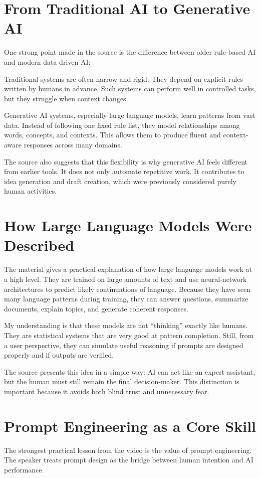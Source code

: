 \documentclass[12pt,a4paper]{article}
\begin{document}
\section*{From Traditional AI to Generative AI}
One strong point made in the source is the difference between older rule-based AI and modern data-driven AI:

Traditional systems are often narrow and rigid. They depend on explicit rules written by humans in advance. Such systems can perform well in controlled tasks, but they struggle when context changes.

Generative AI systems, especially large language models, learn patterns from vast data. Instead of following one fixed rule list, they model relationships among words, concepts, and contexts. This allows them to produce fluent and context-aware responses across many domains.

The source also suggests that this flexibility is why generative AI feels different from earlier tools. It does not only automate repetitive work. It contributes to idea generation and draft creation, which were previously considered purely human activities.

\section*{How Large Language Models Were Described}
The material gives a practical explanation of how large language models work at a high level. They are trained on large amounts of text and use neural-network architectures to predict likely continuations of language. Because they have seen many language patterns during training, they can answer questions, summarize documents, explain topics, and generate coherent responses.

My understanding is that these models are not ``thinking'' exactly like humans. They are statistical systems that are very good at pattern completion. Still, from a user perspective, they can simulate useful reasoning if prompts are designed properly and if outputs are verified.

The source presents this idea in a simple way: AI can act like an expert assistant, but the human must still remain the final decision-maker. This distinction is important because it avoids both blind trust and unnecessary fear.

\section*{Prompt Engineering as a Core Skill}
The strongest practical lesson from the video is the value of prompt engineering. The speaker treats prompt design as the bridge between human intention and AI performance.
\end{document}
